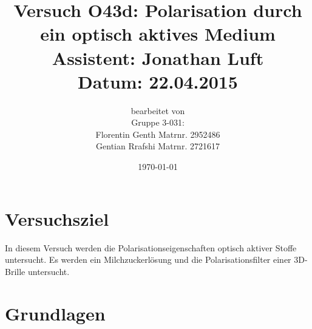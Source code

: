 \documentclass[fontsize=12pt]{scrartcl}
\begin{document}
\begin{minipage}{\textwidth}
\begin{center}\large
\title{\textbf{Versuch O43d: Polarisation durch ein optisch aktives Medium} \\
		Assistent: Jonathan Luft \\
		Datum: 22.04.2015}

\author{bearbeitet von\\
		Gruppe 3-031: \\
		Florentin Genth Matrnr. 2952486 \\
		Gentian Rrafshi Matrnr. 2721617 }
\date{\today}

\maketitle

\end{center}
\end{minipage}

\newpage

\tableofcontents

\newpage
\noindent

\section{ Versuchsziel}

In diesem Versuch werden die Polarisationseigenschaften optisch aktiver Stoffe untersucht. Es werden ein Milchzuckerlösung und die Polarisationsfilter einer 
3D-Brille untersucht.

\section{ Grundlagen}
\end{document}
